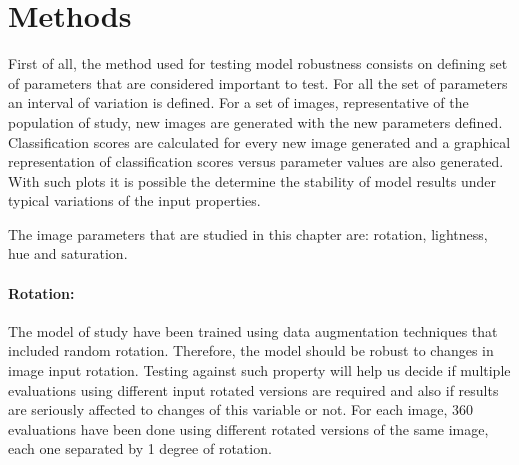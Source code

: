 



\section{Methods}

First of all, the method used for testing model robustness consists on defining set of parameters that are considered important to test. For all the set of parameters an interval of variation is defined. For a set of images, representative of the population of study, new images are generated with the new parameters defined. Classification scores are calculated for every new image generated and a graphical representation of classification scores versus parameter values are also generated. With such plots it is possible the determine the stability of model results under typical variations of the input properties.

The image parameters that are studied in this chapter are: rotation, lightness, hue and saturation.

\paragraph{Rotation:} The model of study have been trained using data augmentation techniques that included random rotation. Therefore, the model should be robust to changes in image input rotation. Testing against such property will help us decide if multiple evaluations using different input rotated versions are required and also if results are seriously affected to changes of this variable or not. For each image, 360 evaluations have been done using different rotated versions of the same image, each one separated by 1 degree of rotation.

